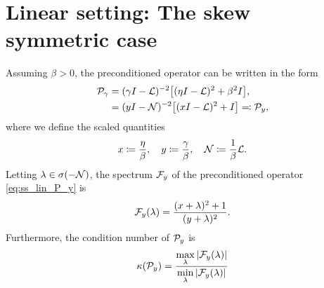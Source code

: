 \documentclass[a4paper,10pt]{article}
\begin{document}
%
%


\section{Linear setting: The skew symmetric case}
\label{sec:lin_ss}
Assuming $\beta > 0$, the preconditioned operator can be written in the form
\begin{align} 
\label{eq:ss_lin_P_gamma}
{\cal P}_{\gamma} &= (\gamma I - {\cal L})^{-2} \big[ (\eta I - {\cal L})^2 + \beta^2 I \big],\\
\label{eq:ss_lin_P_y}
&= (y I - {\cal N})^{-2} \big[ (x I - {\cal L})^2 + I \big] \eqqcolon {\cal P}_y,
\end{align}
where we define the scaled quantities 
\begin{align} 
\label{eq:ss_lin_scaled_var}
x \coloneqq \frac{\eta}{\beta}, 
\quad 
y \coloneqq \frac{\gamma}{\beta}, 
\quad 
{\cal N} \coloneqq \frac{1}{\beta} {\cal L}.
\end{align}
Letting $\lambda \in \sigma(- {\cal N})$, the spectrum ${\cal F}_y$ of the preconditioned operator \eqref{eq:ss_lin_P_y} is
\begin{align}
{\cal F}_y(\lambda) = \frac{(x+\lambda)^2 + 1}{(y + \lambda)^2}.
\end{align}
Furthermore, the condition number of ${\cal P}_y$ is 
\begin{align} \label{eq:ss_lin_kappa_def}
\kappa({\cal P}_y) = \frac{\underset{\lambda}{\max} \, | {\cal F}_y(\lambda) |}{\underset{\lambda}{\min} \, | {\cal F}_y(\lambda)|}
\end{align}
\end{document}
